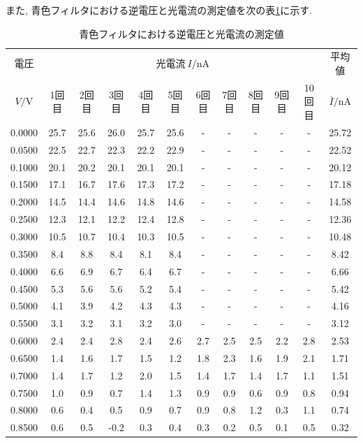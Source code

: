 \documentclass{jarticle}
\begin{document}
また, 青色フィルタにおける逆電圧と光電流の測定値を次の表\ref{tb:blue-filter}に示す.

\begin{table}[H]
  \caption{青色フィルタにおける逆電圧と光電流の測定値}
  \label{tb:blue-filter}
  \hspace{-2.5cm}
  \begin{tabular}{cccccccccccc}
    \hline
    電圧 & \multicolumn{10}{c}{光電流$\ I/\mathrm{nA}$} & 平均値 \\
    $V/\mathrm{V}$ & 1回目 & 2回目 & 3回目 & 4回目 & 5回目 & 6回目 & 7回目 & 8回目 & 9回目 & 10回目 & $\overline{I}/\mathrm{nA}$ \\
    \hline
    0.0000 & 25.7 & 25.6 & 26.0 & 25.7 & 25.6 & - & - & - & - & - & 25.72 \\
    0.0500 & 22.5 & 22.7 & 22.3 & 22.2 & 22.9 & - & - & - & - & - & 22.52 \\
    0.1000 & 20.1 & 20.2 & 20.1 & 20.1 & 20.1 & - & - & - & - & - & 20.12 \\
    0.1500 & 17.1 & 16.7 & 17.6 & 17.3 & 17.2 & - & - & - & - & - & 17.18 \\
    0.2000 & 14.5 & 14.4 & 14.6 & 14.8 & 14.6 & - & - & - & - & - & 14.58 \\
    0.2500 & 12.3 & 12.1 & 12.2 & 12.4 & 12.8 & - & - & - & - & - & 12.36 \\
    0.3000 & 10.5 & 10.7 & 10.4 & 10.3 & 10.5 & - & - & - & - & - & 10.48 \\
    0.3500 & 8.4 & 8.8 & 8.4 & 8.1 & 8.4 & - & - & - & - & - & 8.42 \\
    0.4000 & 6.6 & 6.9 & 6.7 & 6.4 & 6.7 & - & - & - & - & - & 6.66 \\
    0.4500 & 5.3 & 5.6 & 5.6 & 5.2 & 5.4 & - & - & - & - & - & 5.42 \\
    0.5000 & 4.1 & 3.9 & 4.2 & 4.3 & 4.3 & - & - & - & - & - & 4.16 \\
    0.5500 & 3.1 & 3.2 & 3.1 & 3.2 & 3.0 & - & - & - & - & - & 3.12 \\
    0.6000 & 2.4 & 2.4 & 2.8 & 2.4 & 2.6 & 2.7 & 2.5 & 2.5 & 2.2 & 2.8 & 2.53 \\
    0.6500 & 1.4 & 1.6 & 1.7 & 1.5 & 1.2 & 1.8 & 2.3 & 1.6 & 1.9 & 2.1 & 1.71 \\
    0.7000 & 1.4 & 1.7 & 1.2 & 2.0 & 1.5 & 1.4 & 1.7 & 1.4 & 1.7 & 1.1 & 1.51 \\
    0.7500 & 1.0 & 0.9 & 0.7 & 1.4 & 1.3 & 0.9 & 0.9 & 0.6 & 0.9 & 0.8 & 0.94 \\
    0.8000 & 0.6 & 0.4 & 0.5 & 0.9 & 0.7 & 0.9 & 0.8 & 1.2 & 0.3 & 1.1 & 0.74 \\
    0.8500 & 0.6 & 0.5 & -0.2 & 0.3 & 0.4 & 0.3 & 0.2 & 0.5 & 0.1 & 0.5 & 0.32 \\
    \hline
  \end{tabular}
\end{table}
\end{document}
